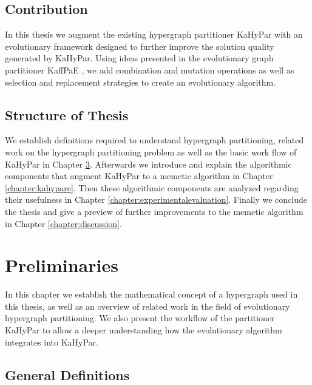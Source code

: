 \documentclass[a4paper,12pt,titlepage, BCOR7mm,headsepline]{scrbook}
\numberwithin{equation}{section}
\begin{document}
\section{Contribution}
In this thesis we augment the existing hypergraph partitioner KaHyPar \cite{schlag2016k} with an evolutionary framework designed to further improve the solution quality generated by KaHyPar. Using ideas presented in the evolutionary graph partitioner KaffPaE \cite{sanders2012distributed}, we add combination and mutation operations as well as selection and replacement strategies to create an evolutionary algorithm.  
\section{Structure of Thesis}
We establish definitions required to understand hypergraph partitioning, related work on the hypergraph partitioning problem as well as the basic work flow of KaHyPar in Chapter \ref{chapter:preliminaries}.
Afterwards we introduce and explain the algorithmic components that augment KaHyPar to a memetic algorithm in Chapter \ref{chapter:kahypare}. 
Then these algorithmic components are analyzed regarding their usefulness in Chapter \ref{chapter:experimentalevaluation}.
Finally we conclude the thesis and give a preview of further improvements to the memetic algorithm in Chapter \ref{chapter:discussion}.
\chapter{Preliminaries}
\label{chapter:preliminaries}
In this chapter we establish the mathematical concept of a hypergraph used in this thesis, as well as an overview of related work in the field of evolutionary hypergraph partitioning. We also present the workflow of the partitioner KaHyPar to allow a deeper understanding how the evolutionary algorithm integrates into KaHyPar.
\section{General Definitions}
\end{document}
